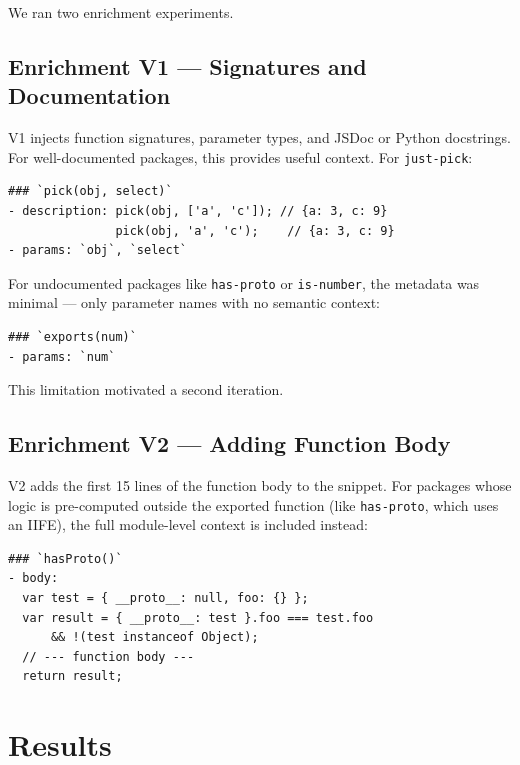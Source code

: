 \documentclass[11pt,a4paper]{article}
\begin{document}
We ran two enrichment experiments.

\subsection{Enrichment V1 — Signatures and Documentation}

V1 injects function signatures, parameter types, and JSDoc or Python docstrings. For well-documented packages, this provides useful context. For \texttt{just-pick}:

\begin{verbatim}
### `pick(obj, select)`
- description: pick(obj, ['a', 'c']); // {a: 3, c: 9}
               pick(obj, 'a', 'c');    // {a: 3, c: 9}
- params: `obj`, `select`
\end{verbatim}

For undocumented packages like \texttt{has-proto} or \texttt{is-number}, the metadata was minimal — only parameter names with no semantic context:

\begin{verbatim}
### `exports(num)`
- params: `num`
\end{verbatim}

This limitation motivated a second iteration.

\subsection{Enrichment V2 — Adding Function Body}

V2 adds the first 15 lines of the function body to the snippet. For packages whose logic is pre-computed outside the exported function (like \texttt{has-proto}, which uses an IIFE), the full module-level context is included instead:

\begin{verbatim}
### `hasProto()`
- body:
  var test = { __proto__: null, foo: {} };
  var result = { __proto__: test }.foo === test.foo
      && !(test instanceof Object);
  // --- function body ---
  return result;
\end{verbatim}

\section{Results}
\end{document}
